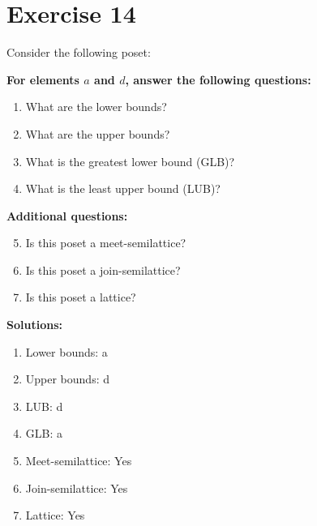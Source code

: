 \documentclass{article}
\begin{document}
\section*{Exercise 14}
Consider the following poset:
\begin{center}
\end{center}

    \textbf{For elements $a$ and $d$, answer the following questions:}
\begin{enumerate}
    \item What are the lower bounds?
    \item What are the upper bounds?
    \item What is the greatest lower bound (GLB)?
    \item What is the least upper bound (LUB)?
\end{enumerate}
    \hspace*{3ex} \textbf{Additional questions:}
\begin{enumerate}
    \setcounter{enumi}{4}
    \item Is this poset a meet-semilattice?
    \item Is this poset a join-semilattice?
    \item Is this poset a lattice?
\end{enumerate}

\textbf{Solutions:}
\begin{enumerate}
    \item Lower bounds: {a}
    \item Upper bounds: {d}
    \item LUB: d
    \item GLB: a
    \item Meet-semilattice: Yes
    \item Join-semilattice: Yes
    \item Lattice: Yes
\end{enumerate}
\newpage
\end{document}
